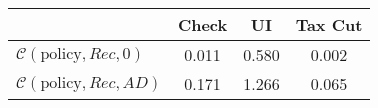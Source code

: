 \begin{tabular}{@{}lccc@{}} 
\toprule 
                          & Check      & UI    & Tax Cut    \\  \midrule 
$\mathcal{C}(\text{policy},Rec,0)$ & 0.011  & 0.580  & 0.002     \\ 
$\mathcal{C}(\text{policy},Rec,AD)$ & 0.171  & 1.266  & 0.065     \\ 
\end{tabular}  
